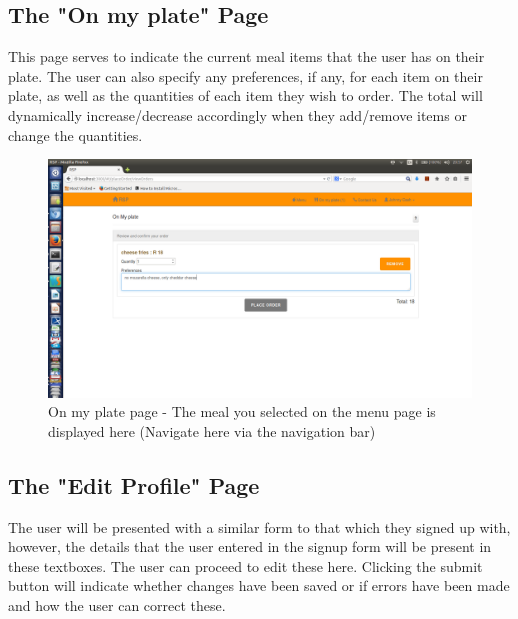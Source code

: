 \documentclass[a4paper,12pt]{article}
\begin{document}
\subsection{The "On my plate" Page} 
This page serves to indicate the current meal items that the user has on their plate. The user can also specify any preferences, if any, for each item on their plate, as well as the quantities of each item they wish to order. The total will dynamically increase/decrease accordingly when they add/remove items or change the quantities.

\begin{figure}[H]
  \centering
    \includegraphics[width=1.0\textwidth]{screenshots/addedOnPlate.png}
    \caption{On my plate page - The meal you selected on the menu page is displayed here (Navigate here via the navigation bar)} 
\end{figure}

\subsection{The "Edit Profile" Page} 
The user will be presented with a similar form to that which they signed up with, however, the details that the user entered in the signup form will be present in these textboxes. The user can proceed to edit these here. Clicking the submit button will indicate whether changes have been saved or if errors have been made and how the user can correct these.
\end{document}
